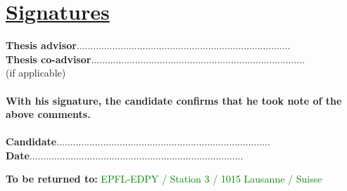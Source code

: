 \documentclass[11pt,titlepage]{article}
\begin{document}
\section*{\underline{Signatures}\\}
\noindent \textbf{Thesis advisor}\hspace{6.25cm}..............................................................................\vspace{0.5cm}\\

\noindent \textbf{Thesis co-advisor}\hspace{5.7cm}..............................................................................\\
\noindent  (if applicable)\\\\

\noindent \textbf{With his signature, the candidate confirms that he took note of the above comments.}\\\\
\textbf{Candidate}\hspace{7cm}..............................................................................\vspace{0.5cm}\\

\noindent \textbf{Date}\hspace{8.05cm}..............................................................................\\

\vspace{0.8cm}
\begin{center}
\end{center}
\begin{center}
\textbf{To be returned to:} \textcolor{green}{EPFL-EDPY / Station 3 / 1015 Lausanne / Suisse}
\end{center}
\end{document}
